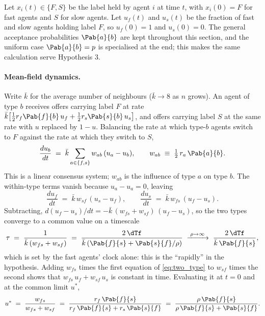Let $x_i(t) \in \{F, S\}$ be the label held by agent $i$ at time $t$, with $x_i(0) = F$ for fast agents and $S$ for slow agents. Let $u_f(t)$ and $u_s(t)$ be the fraction of fast and slow agents holding label $F$, so $u_f(0) = 1$ and $u_s(0) = 0$. The general acceptance probabilities $\Pab{a}{b}$ are kept throughout this section, and the uniform case $\Pab{a}{b} = p$ is specialised at the end; this makes the same calculation serve Hypothesis 3.

\paragraph{Mean-field dynamics.} Write $\bar k$ for the average number of neighbours ($\bar k \to 8$ as $n$ grows). An agent of type $b$ receives offers carrying label $F$ at rate $\bar k\bigl[\tfrac12 r_f \Pab{f}{b}\, u_f + \tfrac12 r_s \Pab{s}{b}\, u_s\bigr]$, and offers carrying label $S$ at the same rate with $u$ replaced by $1-u$. Balancing the rate at which type-$b$ agents switch to $F$ against the rate at which they switch to $S$,
\begin{equation}
\frac{du_b}{dt} \;=\; \bar k \sum_{a \in \{f,s\}} w_{ab}\,(u_a - u_b), \qquad w_{ab} \;\equiv\; \tfrac12\, r_a\, \Pab{a}{b}.
\label{eq:consensus}
\end{equation}
This is a linear consensus system; $w_{ab}$ is the influence of type $a$ on type $b$. The within-type terms vanish because $u_a - u_a = 0$, leaving
\begin{equation}
\frac{du_f}{dt} \;=\; \bar k\, w_{sf}\,(u_s - u_f), \qquad
\frac{du_s}{dt} \;=\; \bar k\, w_{fs}\,(u_f - u_s).
\label{eq:two_type}
\end{equation}
Subtracting, $d(u_f - u_s)/dt = -\bar k\,(w_{fs} + w_{sf})\,(u_f - u_s)$, so the two types converge to a common value on a timescale
\begin{equation}
\tau \;=\; \frac{1}{\bar k\,(w_{fs} + w_{sf})} \;=\; \frac{2\,\dTf}{\bar k\,(\Pab{f}{s} + \Pab{s}{f}/\rho)} \;\xrightarrow{\;\rho \to \infty\;}\; \frac{2\,\dTf}{\bar k\,\Pab{f}{s}},
\label{eq:tau}
\end{equation}
which is set by the fast agents' clock alone: this is the ``rapidly'' in the hypothesis. Adding $w_{fs}$ times the first equation of \eqref{eq:two_type} to $w_{sf}$ times the second shows that $w_{fs}\,u_f + w_{sf}\,u_s$ is constant in time. Evaluating it at $t = 0$ and at the common limit $u^\ast$,
\begin{equation}
u^\ast \;=\; \frac{w_{fs}}{w_{fs} + w_{sf}} \;=\; \frac{r_f\, \Pab{f}{s}}{r_f\, \Pab{f}{s} + r_s\, \Pab{s}{f}}
\;=\; \frac{\rho\, \Pab{f}{s}}{\rho\, \Pab{f}{s} + \Pab{s}{f}}.
\label{eq:ustar}
\end{equation}

